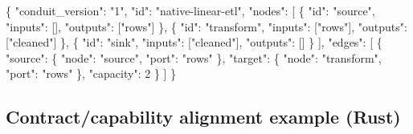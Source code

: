 \documentclass[
  letterpaper,
]{report}
\newenvironment{Shaded}{\begin{snugshade}}{\end{snugshade}}
\newcommand{\DataTypeTok}[1]{\textcolor[rgb]{0.68,0.00,0.00}{#1}}
\newcommand{\DecValTok}[1]{\textcolor[rgb]{0.68,0.00,0.00}{#1}}
\newcommand{\FunctionTok}[1]{\textcolor[rgb]{0.28,0.35,0.67}{#1}}
\newcommand{\OtherTok}[1]{\textcolor[rgb]{0.00,0.23,0.31}{#1}}
\newcommand{\StringTok}[1]{\textcolor[rgb]{0.13,0.47,0.30}{#1}}
\begin{document}
\begin{Shaded}
\begin{Highlighting}[]
\FunctionTok{\{}
  \DataTypeTok{"conduit\_version"}\FunctionTok{:} \StringTok{"1"}\FunctionTok{,}
  \DataTypeTok{"id"}\FunctionTok{:} \StringTok{"native{-}linear{-}etl"}\FunctionTok{,}
  \DataTypeTok{"nodes"}\FunctionTok{:} \OtherTok{[}
    \FunctionTok{\{} \DataTypeTok{"id"}\FunctionTok{:} \StringTok{"source"}\FunctionTok{,} \DataTypeTok{"inputs"}\FunctionTok{:} \OtherTok{[]}\FunctionTok{,} \DataTypeTok{"outputs"}\FunctionTok{:} \OtherTok{[}\StringTok{"rows"}\OtherTok{]} \FunctionTok{\}}\OtherTok{,}
    \FunctionTok{\{} \DataTypeTok{"id"}\FunctionTok{:} \StringTok{"transform"}\FunctionTok{,} \DataTypeTok{"inputs"}\FunctionTok{:} \OtherTok{[}\StringTok{"rows"}\OtherTok{]}\FunctionTok{,} \DataTypeTok{"outputs"}\FunctionTok{:} \OtherTok{[}\StringTok{"cleaned"}\OtherTok{]} \FunctionTok{\}}\OtherTok{,}
    \FunctionTok{\{} \DataTypeTok{"id"}\FunctionTok{:} \StringTok{"sink"}\FunctionTok{,} \DataTypeTok{"inputs"}\FunctionTok{:} \OtherTok{[}\StringTok{"cleaned"}\OtherTok{]}\FunctionTok{,} \DataTypeTok{"outputs"}\FunctionTok{:} \OtherTok{[]} \FunctionTok{\}}
  \OtherTok{]}\FunctionTok{,}
  \DataTypeTok{"edges"}\FunctionTok{:} \OtherTok{[}
    \FunctionTok{\{}
      \DataTypeTok{"source"}\FunctionTok{:} \FunctionTok{\{} \DataTypeTok{"node"}\FunctionTok{:} \StringTok{"source"}\FunctionTok{,} \DataTypeTok{"port"}\FunctionTok{:} \StringTok{"rows"} \FunctionTok{\},}
      \DataTypeTok{"target"}\FunctionTok{:} \FunctionTok{\{} \DataTypeTok{"node"}\FunctionTok{:} \StringTok{"transform"}\FunctionTok{,} \DataTypeTok{"port"}\FunctionTok{:} \StringTok{"rows"} \FunctionTok{\},}
      \DataTypeTok{"capacity"}\FunctionTok{:} \DecValTok{2}
    \FunctionTok{\}}
  \OtherTok{]}
\FunctionTok{\}}
\end{Highlighting}
\end{Shaded}

\subsection{Contract/capability alignment example
(Rust)}\label{contractcapability-alignment-example-rust}
\end{document}
